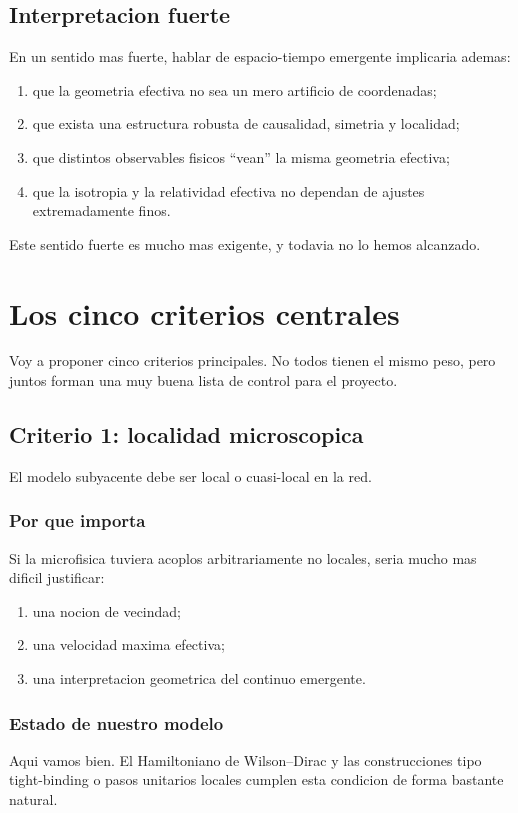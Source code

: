 \subsection{Interpretacion fuerte}
En un sentido mas fuerte, hablar de espacio-tiempo emergente implicaria ademas:
\begin{enumerate}[label=\arabic*.]
    \item que la geometria efectiva no sea un mero artificio de coordenadas;
    \item que exista una estructura robusta de causalidad, simetria y localidad;
    \item que distintos observables fisicos \enquote{vean} la misma geometria efectiva;
    \item que la isotropia y la relatividad efectiva no dependan de ajustes extremadamente finos.
\end{enumerate}

Este sentido fuerte es mucho mas exigente, y todavia no lo hemos alcanzado.

\section{Los cinco criterios centrales}
Voy a proponer cinco criterios principales. No todos tienen el mismo peso, pero juntos forman una muy buena lista de control para el proyecto.

\subsection{Criterio 1: localidad microscopica}
El modelo subyacente debe ser local o cuasi-local en la red.

\subsubsection*{Por que importa}
Si la microfisica tuviera acoplos arbitrariamente no locales, seria mucho mas dificil justificar:
\begin{enumerate}[label=\arabic*.]
    \item una nocion de vecindad;
    \item una velocidad maxima efectiva;
    \item una interpretacion geometrica del continuo emergente.
\end{enumerate}

\subsubsection*{Estado de nuestro modelo}
Aqui vamos bien. El Hamiltoniano de Wilson--Dirac y las construcciones tipo tight-binding o pasos unitarios locales cumplen esta condicion de forma bastante natural.

